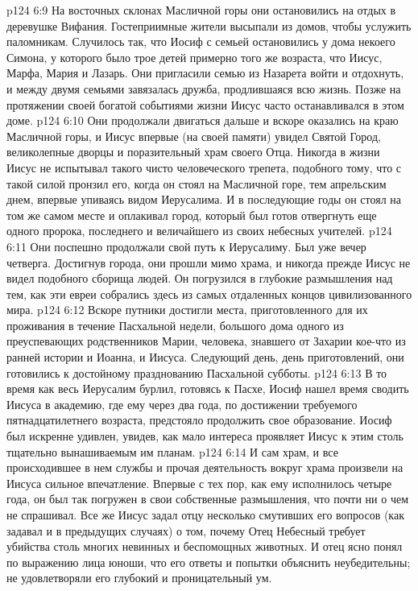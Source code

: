 \vs p124 6:9 На восточных склонах Масличной горы они остановились на отдых в деревушке Вифания. Гостеприимные жители высыпали из домов, чтобы услужить паломникам. Случилось так, что Иосиф с семьей остановились у дома некоего Симона, у которого было трое детей примерно того же возраста, что Иисус, Марфа, Мария и Лазарь. Они пригласили семью из Назарета войти и отдохнуть, и между двумя семьями завязалась дружба, продлившаяся всю жизнь. Позже на протяжении своей богатой событиями жизни Иисус часто останавливался в этом доме.
\vs p124 6:10 Они продолжали двигаться дальше и вскоре оказались на краю Масличной горы, и Иисус впервые (на своей памяти) увидел Святой Город, великолепные дворцы и поразительный храм своего Отца. Никогда в жизни Иисус не испытывал такого чисто человеческого трепета, подобного тому, что с такой силой пронзил его, когда он стоял на Масличной горе, тем апрельским днем, впервые упиваясь видом Иерусалима. И в последующие годы он стоял на том же самом месте и оплакивал город, который был готов отвергнуть еще одного пророка, последнего и величайшего из своих небесных учителей.
\vs p124 6:11 Они поспешно продолжали свой путь к Иерусалиму. Был уже вечер четверга. Достигнув города, они прошли мимо храма, и никогда прежде Иисус не видел подобного сборища людей. Он погрузился в глубокие размышления над тем, как эти евреи собрались здесь из самых отдаленных концов цивилизованного мира.
\vs p124 6:12 Вскоре путники достигли места, приготовленного для их проживания в течение Пасхальной недели, большого дома одного из преуспевающих родственников Марии, человека, знавшего от Захарии кое\hyp{}что из ранней истории и Иоанна, и Иисуса. Следующий день, день приготовлений, они готовились к достойному празднованию Пасхальной субботы.
\vs p124 6:13 В то время как весь Иерусалим бурлил, готовясь к Пасхе, Иосиф нашел время сводить Иисуса в академию, где ему через два года, по достижении требуемого пятнадцатилетнего возраста, предстояло продолжить свое образование. Иосиф был искренне удивлен, увидев, как мало интереса проявляет Иисус к этим столь тщательно вынашиваемым им планам.
\vs p124 6:14 И сам храм, и все происходившее в нем службы и прочая деятельность вокруг храма произвели на Иисуса сильное впечатление. Впервые с тех пор, как ему исполнилось четыре года, он был так погружен в свои собственные размышления, что почти ни о чем не спрашивал. Все же Иисус задал отцу несколько смутивших его вопросов (как задавал и в предыдущих случаях) о том, почему Отец Небесный требует убийства столь многих невинных и беспомощных животных. И отец ясно понял по выражению лица юноши, что его ответы и попытки объяснить неубедительны; не удовлетворяли его глубокий и проницательный ум.
